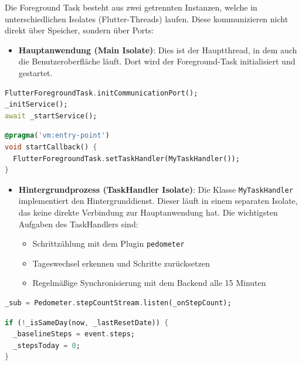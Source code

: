 \documentclass[11pt,a4paper]{article}
\begin{document}
Die Foreground Task besteht aus zwei getrennten Instanzen, welche in unterschiedlichen Isolates (Flutter-Threads) laufen. Diese kommunizieren nicht direkt über Speicher, sondern über Ports:

\begin{itemize}[leftmargin=1.5em]
    \item \textbf{Hauptanwendung (Main Isolate)}: Dies ist der Hauptthread, in dem auch die Benutzeroberfläche läuft. Dort wird der Foreground-Task initialisiert und gestartet.
\end{itemize}

\begin{lstlisting}[language=Dart, caption=Initialisierung des Foreground Task]
FlutterForegroundTask.initCommunicationPort();
_initService();
await _startService();
\end{lstlisting}

\begin{lstlisting}[language=Dart, caption=Registrierung des Task Handlers]
@pragma('vm:entry-point')
void startCallback() {
  FlutterForegroundTask.setTaskHandler(MyTaskHandler());
}
\end{lstlisting}

\begin{itemize}[leftmargin=1.5em]
    \item \textbf{Hintergrundprozess (TaskHandler Isolate)}: Die Klasse \texttt{MyTaskHandler} implementiert den Hintergrunddienst. Dieser läuft in einem separaten Isolate, das keine direkte Verbindung zur Hauptanwendung hat. Die wichtigsten Aufgaben des TaskHandlers sind:
    \begin{itemize}
        \item Schrittzählung mit dem Plugin \texttt{pedometer}\cite{pedometer}
        \item Tageswechsel erkennen und Schritte zurücksetzen
        \item Regelmäßige Synchronisierung mit dem Backend alle 15 Minuten
    \end{itemize}
\end{itemize}

\begin{lstlisting}[language=Dart, caption=Schrittzählung starten]
_sub = Pedometer.stepCountStream.listen(_onStepCount);
\end{lstlisting}

\begin{lstlisting}[language=Dart, caption=Tageswechsel erkennen]
if (!_isSameDay(now, _lastResetDate)) {
  _baselineSteps = event.steps;
  _stepsToday = 0;
}
\end{lstlisting}
\end{document}
